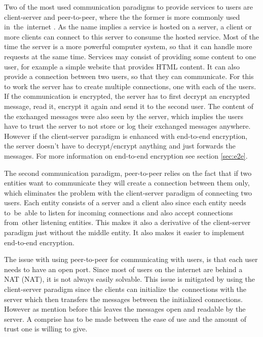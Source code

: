 Two of the most used communication paradigms to provide services to users are client-server and peer-to-peer, where the the former is more commonly used in~the~internet \cite{Forouzan2010}. As the name implies a service is hosted on a server, a client or more clients can connect to this server to consume the hosted service. Most of the time the server is a more powerful computer system, so that it can handle more requests at the same time. Services may consist of providing some content to one user, for example a simple website that provides HTML content. It can also provide a connection between two users, so that they can communicate. For this to work the server has to create multiple connections, one with each of the users. If the communication is encrypted, the server has to first decrypt an encrypted message, read it, encrypt it again and send it to the second user. The content of the exchanged messages were also seen by the server, which implies the users have to trust the server to not store or log their exchanged messages anywhere. However if the client-server paradigm is enhanced with end-to-end encryption, the server doesn't have to decrypt/encrypt anything and just forwards the messages. For more information on end-to-end encryption see section \ref{sec:e2e}.

The second communication paradigm, peer-to-peer relies on the fact that if two entities want to communicate they will create a connection between them only, which eliminates the problem with the client-server paradigm of connecting two users. Each entity consists of a server and a client also since each entity needs to~be~able to listen for incoming connections and also accept connections from~other listening entities. This makes it also a derivative of the client-server paradigm just without the middle entity. It also makes it easier to implement end-to-end encryption.

The issue with using peer-to-peer for communicating with users, is that each user needs to have an open port. Since most of users on the internet are behind a NAT (\acl{NAT}), it is not always easily solvable. This issue is mitigated by using the client-server paradigm since the clients can initialize the~connections with the server which then transfers the messages between the initialized connections. However as mention before this leaves the messages open and readable by the server. A comprise has to be made between the ease of use and the amount of trust one is willing to give.
